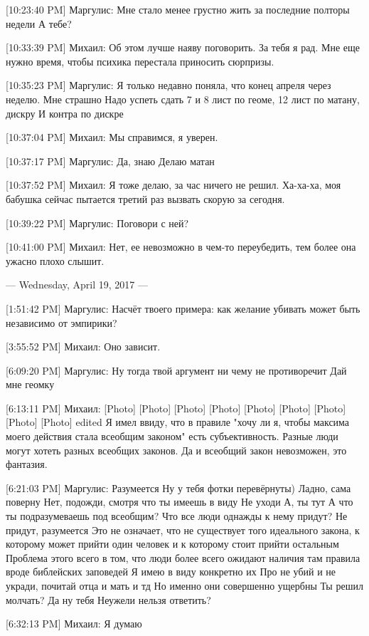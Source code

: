 \documentclass{article}
\begin{document}
[10:23:40 PM] Маргулис:
Мне стало менее грустно жить за последние полторы недели
 А тебе?

[10:33:39 PM] Михаил:
Об этом лучше наяву поговорить.
 За тебя я рад. Мне еще нужно время, чтобы психика перестала приносить сюрпризы.

[10:35:23 PM] Маргулис:
Я только недавно поняла, что конец апреля через неделю.
 Мне страшно
 Надо успеть сдать 7 и 8 лист по геоме, 12 лист по матану, дискру
 И контра по дискре

[10:37:04 PM] Михаил:
Мы справимся, я уверен.

[10:37:17 PM] Маргулис:
Да, знаю
 Делаю матан

[10:37:52 PM] Михаил:
Я тоже делаю, за час ничего не решил.
 Ха-ха-ха, моя бабушка сейчас пытается третий раз вызвать скорую за сегодня.

[10:39:22 PM] Маргулис:
Поговори с ней?

[10:41:00 PM] Михаил:
Нет, ее невозможно в чем-то переубедить, тем более она ужасно плохо слышит.

--- Wednesday, April 19, 2017 ---

[1:51:42 PM] Маргулис:
Насчёт твоего примера: как желание убивать может быть независимо от эмпирики?

[3:55:52 PM] Михаил:
Оно зависит.

[6:09:20 PM] Маргулис:
Ну тогда твой аргумент ни чему не противоречит
 Дай мне геомку

[6:13:11 PM] Михаил:
[Photo]
 [Photo]
 [Photo]
 [Photo]
 [Photo]
 [Photo]
 [Photo]
 [Photo]
 [Photo]
edited 
Я имел ввиду, что в правиле "хочу ли я, чтобы максима моего действия стала всеобщим законом" есть субъективность. Разные люди могут хотеть разных всеобщих законов. Да и всеобщий закон невозможен, это фантазия.

[6:21:03 PM] Маргулис:
Разумеется
 Ну у тебя фотки перевёрнуты)
 Ладно, сама поверну
 Нет, подожди, смотря что ты имеешь в виду
 Не уходи
 А, ты тут
 А что ты подразумеваешь под всеобщим? Что все люди однажды к нему придут? Не придут, разумеется
 Это не означает, что не существует того идеального закона, к которому может прийти один человек и к которому стоит прийти остальным
 Проблема этого всего в том, что люди более всего ожидают наличия там правила вроде библейских заповедей
 Я имею в виду конкретно их
 Про не убий и не укради, почитай отца и мать и тд
 Но именно они совершенно ущербны
 Ты решил молчать?
 Да ну тебя
 Неужели нельзя ответить?

[6:32:13 PM] Михаил:
Я думаю
\end{document}
